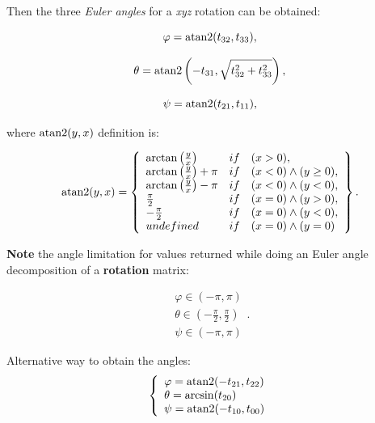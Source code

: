     Then the three \textit{Euler angles} for a \textit{xyz} rotation
    can be obtained:

    \begin{equation}
        \varphi = \operatorname{atan2}(t_{32}, t_{33})
    ,\end{equation}

    \begin{equation}
        \theta = \operatorname{atan2} \left(-t_{31}, \sqrt{ t_{32}^{2} + t_{33}^{2}} \right)
    ,\end{equation}

    \begin{equation}
        \psi = \operatorname{atan2}(t_{21}, t_{11})
    ,\end{equation}

    where $\operatorname{atan2}(y, x)$ definition is:

    \begin{equation}
        \operatorname{atan2}(y, x) = \left\{
            \begin{array}{ll}
                \arctan\left(\frac{y}{x}\right) & if \quad (x > 0),\\
                \arctan\left(\frac{y}{x}\right) + \pi & if \quad (x < 0) \land (y \ge 0),\\
                \arctan\left(\frac{y}{x}\right) - \pi & if \quad (x < 0) \land  (y < 0),\\
                \frac{\pi}{2} & if \quad (x = 0) \land  (y > 0),\\
                -\frac{\pi}{2} & if \quad (x = 0) \land  (y < 0),\\
                undefined & if \quad (x = 0) \land (y = 0)
            \end{array}
        \right\}
    .\end{equation}

    \textbf{Note} the angle limitation for values returned while doing
    an Euler angle decomposition of a \textbf{rotation} matrix:

    \begin{equation}
        \begin{array}{l}
            \varphi \in (-\pi, \pi) \\
            \theta \in (-\frac{\pi}{2}, \frac{\pi}{2}) \\
            \psi \in (-\pi, \pi)
        \end{array}
    .\end{equation}

    Alternative way to obtain the angles:
    \begin{equation}
        \left\{ \begin{array}{l}
            \varphi = \operatorname{atan2}(-t_{21}, t_{22}) \\
            \theta = \arcsin(t_{20}) \\
            \psi = \operatorname{atan2}(-t_{10}, t_{00})
        \end{array} \right.
    \end{equation}

